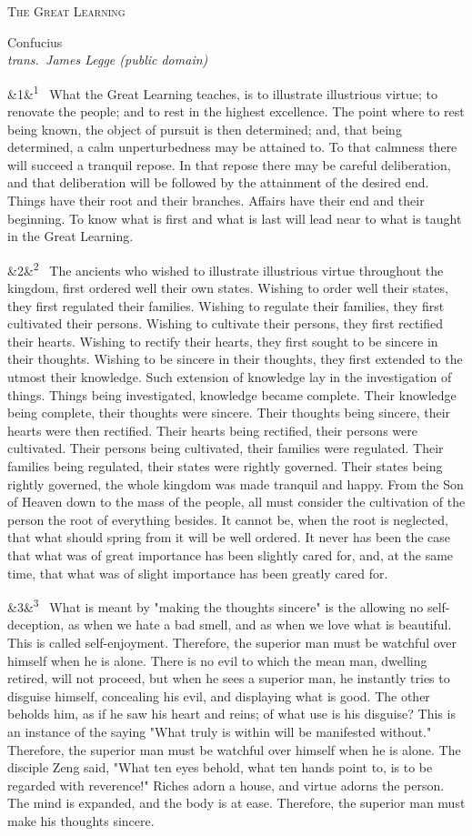 \documentclass[12pt]{article}
\newcommand{\work}[1]{\begin{center}\LARGE\scshape #1\end{center}}
\newcommand{\attrib}[2]{\begin{center}\large #1\\[2pt]\small\itshape trans.\ #2\end{center}\vspace{1em}}
\newcommand{\para}[1][]{\par\noindent\ifx&#1&\else\textsuperscript{\footnotesize #1}~\fi}
\begin{document}
\work{The Great Learning}
\attrib{Confucius}{James Legge (public domain)}

\para[1] What the Great Learning teaches, is to illustrate illustrious virtue; to renovate the people; and to rest in the highest excellence. The point where to rest being known, the object of pursuit is then determined; and, that being determined, a calm unperturbedness may be attained to. To that calmness there will succeed a tranquil repose. In that repose there may be careful deliberation, and that deliberation will be followed by the attainment of the desired end. Things have their root and their branches. Affairs have their end and their beginning. To know what is first and what is last will lead near to what is taught in the Great Learning.

\para[2] The ancients who wished to illustrate illustrious virtue throughout the kingdom, first ordered well their own states. Wishing to order well their states, they first regulated their families. Wishing to regulate their families, they first cultivated their persons. Wishing to cultivate their persons, they first rectified their hearts. Wishing to rectify their hearts, they first sought to be sincere in their thoughts. Wishing to be sincere in their thoughts, they first extended to the utmost their knowledge. Such extension of knowledge lay in the investigation of things. Things being investigated, knowledge became complete. Their knowledge being complete, their thoughts were sincere. Their thoughts being sincere, their hearts were then rectified. Their hearts being rectified, their persons were cultivated. Their persons being cultivated, their families were regulated. Their families being regulated, their states were rightly governed. Their states being rightly governed, the whole kingdom was made tranquil and happy. From the Son of Heaven down to the mass of the people, all must consider the cultivation of the person the root of everything besides. It cannot be, when the root is neglected, that what should spring from it will be well ordered. It never has been the case that what was of great importance has been slightly cared for, and, at the same time, that what was of slight importance has been greatly cared for.

\para[3] What is meant by "making the thoughts sincere" is the allowing no self-deception, as when we hate a bad smell, and as when we love what is beautiful. This is called self-enjoyment. Therefore, the superior man must be watchful over himself when he is alone. There is no evil to which the mean man, dwelling retired, will not proceed, but when he sees a superior man, he instantly tries to disguise himself, concealing his evil, and displaying what is good. The other beholds him, as if he saw his heart and reins; of what use is his disguise? This is an instance of the saying "What truly is within will be manifested without." Therefore, the superior man must be watchful over himself when he is alone. The disciple Zeng said, "What ten eyes behold, what ten hands point to, is to be regarded with reverence!" Riches adorn a house, and virtue adorns the person. The mind is expanded, and the body is at ease. Therefore, the superior man must make his thoughts sincere.
\end{document}

